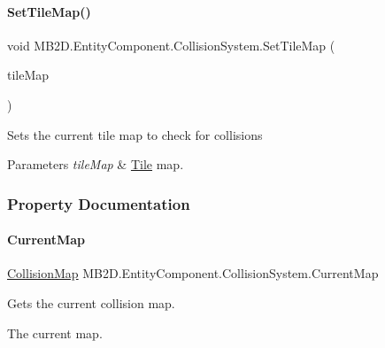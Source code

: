 \paragraph{\texorpdfstring{Set\+Tile\+Map()}{SetTileMap()}}
{\footnotesize\ttfamily void M\+B2\+D.\+Entity\+Component.\+Collision\+System.\+Set\+Tile\+Map (\begin{DoxyParamCaption}\item[{\hyperlink{class_m_b2_d_1_1_tiles_1_1_tile_map}{Tile\+Map}}]{tile\+Map }\end{DoxyParamCaption})\hspace{0.3cm}{\ttfamily [inline]}}



Sets the current tile map to check for collisions 


\begin{DoxyParams}{Parameters}
{\em tile\+Map} & \hyperlink{class_m_b2_d_1_1_tile}{Tile} map.\\
\hline
\end{DoxyParams}


\subsubsection{Property Documentation}
\hypertarget{class_m_b2_d_1_1_entity_component_1_1_collision_system_a338aebc3f288cf68926074026af3dbba}{}\label{class_m_b2_d_1_1_entity_component_1_1_collision_system_a338aebc3f288cf68926074026af3dbba} 
\paragraph{\texorpdfstring{Current\+Map}{CurrentMap}}
{\footnotesize\ttfamily \hyperlink{class_m_b2_d_1_1_collision_1_1_collision_map}{Collision\+Map} M\+B2\+D.\+Entity\+Component.\+Collision\+System.\+Current\+Map\hspace{0.3cm}{\ttfamily [get]}}



Gets the current collision map. 

The current map.\hypertarget{class_m_b2_d_1_1_entity_component_1_1_collision_system_a9448df47918780c8287b6f7ff177d46f}{}\label{class_m_b2_d_1_1_entity_component_1_1_collision_system_a9448df47918780c8287b6f7ff177d46f} 
